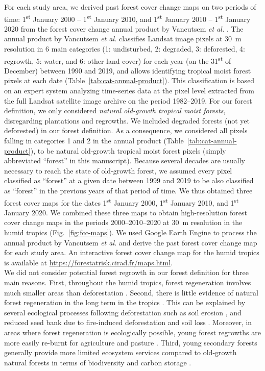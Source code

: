 \documentclass[
  12pt,
]{article}
\begin{document}
For each study area, we derived past forest cover change maps on two periods of time: 1\textsuperscript{st} January 2000 -- 1\textsuperscript{st} January 2010, and 1\textsuperscript{st} January 2010 -- 1\textsuperscript{st} January 2020 from the forest cover change annual product by Vancutsem \emph{et al.} \citep{Vancutsem2021}. The annual product by Vancutsem \emph{et al.} \citep{Vancutsem2021} classifies Landsat image pixels at 30~m resolution in 6 main categories (1: undisturbed, 2: degraded, 3: deforested, 4: regrowth, 5: water, and 6: other land cover) for each year (on the 31\textsuperscript{st} of December) between 1990 and 2019, and allows identifying tropical moist forest pixels at each date (Table~\ref{tab:cat-annual-product}). This classification is based on an expert system analyzing time-series data at the pixel level extracted from the full Landsat satellite image archive on the period 1982--2019. For our forest definition, we only considered \emph{natural old-growth tropical moist forests}, disregarding plantations and regrowths. We included degraded forests (not yet deforested) in our forest definition. As a consequence, we considered all pixels falling in categories 1 and 2 in the annual product (Table~\ref{tab:cat-annual-product}), to be natural old-growth tropical moist forest pixels (simply abbreviated ``forest'' in this manuscript). Because several decades are usually necessary to reach the state of old-growth forest, we assumed every pixel classified as ``forest'' at a given date between 1999 and 2019 to be also classified as ``forest'' in the previous years of that period of time. We thus obtained three forest cover maps for the dates 1\textsuperscript{st} January 2000, 1\textsuperscript{st} January 2010, and 1\textsuperscript{st} January 2020. We combined these three maps to obtain high-resolution forest cover change maps in the periods 2000--2010--2020 at 30~m resolution in the humid tropics (Fig.~\ref{fig:fcc-maps}). We used Google Earth Engine \citep{Gorelick2017} to process the annual product by Vancutsem \emph{et al.} \citep{Vancutsem2021} and derive the past forest cover change map for each study area. An interactive forest cover change map for the humid tropics is available at \url{https://forestatrisk.cirad.fr/maps.html}.\\

We did not consider potential forest regrowth in our forest definition for three main reasons. First, throughout the humid tropics, forest regeneration involves much smaller areas than deforestation \citep{Hansen2013, Vancutsem2021}. Second, there is little evidence of natural forest regeneration in the long term in the tropics \citep{Grouzis2001}. This can be explained by several ecological processes following deforestation such as soil erosion \citep{Grinand2017}, and reduced seed bank due to fire-induced deforestation and soil loss \citep{Grouzis2001}. Moreover, in areas where forest regeneration is ecologically possible, young forest regrowths are more easily re-burnt for agriculture and pasture \citep{Vieilledent2020}. Third, young secondary forests generally provide more limited ecosystem services compared to old-growth natural forests in terms of biodiversity \citep{Gibson2011} and carbon storage \citep{Blanc2009}.
\end{document}
